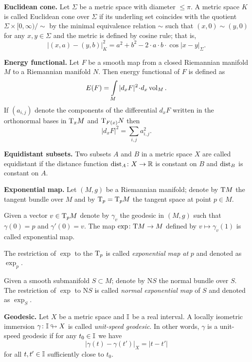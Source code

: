 \begin{description}
\item{\bf Euclidean cone.}\label{Euclidean cone} 
Let $\Sigma$ be a metric space with diameter $\le \pi$. 
A metric space $K$ is called Euclidean cone over $\Sigma$
if its underling set 
coincides with the quotient 
$\Sigma\times [0,\infty)/{\sim}$
by the minimal equivalence relation $\sim$ such that $(x,0)\sim(y,0)$ for any $x,y\in \Sigma$
and the metric is defined by cosine rule;
that is,
$$|(x,a)-(y,b)|^2_K=a^2+b^2-2\cdot a\cdot b\cdot\!\cos|x-y|_\Sigma.$$

\item{\bf Energy functional.}\label{Energy functional} Let $F$ be a smooth map from a closed Riemannian manifold $M$ to a Riemannian manifold $N$.
Then energy functional of $F$ is defined as
\[E(F)=\int\limits_M |d_xF|^2\cdot d_x\vol_M.\]
If $(a_{i,j})$ denote the components 
of the differential $d_xF$ 
written in the orthonormal bases in $\mathrm{T}_xM$ and $\mathrm{T}_{F(x)}N$
then 
\[|d_xF|^2=\sum_{i,j}a_{i,j}^2.\]

\item{\bf Equidistant subsets.}\label{Equidistant subsets} 
Two subsets $A$ and $B$ in a metric space $X$ are called equidistant if the distance function $\operatorname{\rm dist}_A\colon X\to\mathbb{R}$ is constant on $B$ and $\operatorname{\rm dist}_B$ is constant on $A$.

\item{\bf Exponential map.}\label{Exponential map} 
Let $(M,g)$ be a Riemannian manifold;
denote by $\mathrm{T} M$ the tangent bundle over $M$ and by $\mathrm{T}_p=\mathrm{T}_pM$ the tangent space at point $p\in M$.

Given a vector $v\in\mathrm{T}_pM$ denote by $\gamma_v$ the geodesic in $(M,g)$
such that $\gamma(0)=p$ and $\gamma'(0)=v$.
The map $\exp\colon\mathrm{T} M\to M$ defined by $v\mapsto \gamma_v(1)$ is called exponential map.

The restriction of $\exp$ to the $\mathrm{T}_p$ is called \emph{exponential map at} $p$ and denoted as $\exp_p$.

Given a smooth submanifold $S\subset M$;
denote by $\mathrm{N} S$ the normal bundle over $S$.
The restriction of $\exp$ to $\mathrm{N} S$ is called \emph{normal exponential map} of $S$ and denoted as $\exp_S$. 

\item{\bf Geodesic.}\label{Geodesic}  
Let $X$ be a metric space and $\mathbb{I}$ be a real interval.
A locally isometric immersion $\gamma\colon\mathbb{I}\looparrowright X$ is called \emph{unit-speed geodesic}.
In other words, $\gamma$ is a unit-speed geodesic
if for any $t_0\in\mathbb{I}$ we have 
$$|\gamma(t)-\gamma(t')|_X=|t-t'|$$ 
for all $t,t'\in\mathbb{I}$ sufficiently close to $t_0$.


\end{description}
